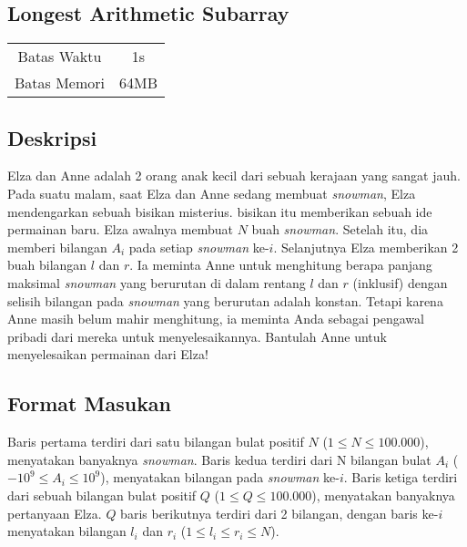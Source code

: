 \documentclass{article}
\begin{document}
\begin{center}
    \section*{Longest Arithmetic Subarray} %

    \begin{tabular}{ | c c | }
        \hline
        Batas Waktu  & 1s \\    %
        Batas Memori & 64MB \\  %
        \hline
    \end{tabular}
\end{center}

\subsection*{Deskripsi}

Elza dan Anne adalah 2 orang anak kecil dari sebuah kerajaan yang sangat jauh.
Pada suatu malam, saat Elza dan Anne sedang membuat \textit{snowman}, Elza mendengarkan sebuah bisikan misterius.
bisikan itu memberikan sebuah ide permainan baru. Elza awalnya membuat $N$ buah \textit{snowman}.
Setelah itu, dia memberi bilangan $A_i$ pada setiap \textit{snowman} ke-$i$.
Selanjutnya Elza memberikan 2 buah bilangan $l$ dan $r$. Ia meminta Anne untuk menghitung berapa panjang maksimal 
\textit{snowman} yang berurutan di dalam rentang $l$ dan $r$ (inklusif) dengan selisih bilangan pada \textit{snowman} yang 
berurutan adalah konstan. Tetapi karena Anne masih belum mahir menghitung, 
ia meminta Anda sebagai pengawal pribadi dari mereka untuk menyelesaikannya.
Bantulah Anne untuk menyelesaikan permainan dari Elza!

\subsection*{Format Masukan}

Baris pertama terdiri dari satu bilangan bulat positif $N$ ($1 \leq N \leq 100.000$), menyatakan banyaknya \textit{snowman}.
Baris kedua terdiri dari N bilangan bulat $A_i$ ($-10^{9} \leq A_i \leq 10^{9}$), menyatakan bilangan pada \textit{snowman} ke-$i$.
Baris ketiga terdiri dari sebuah bilangan bulat positif $Q$ ($1 \leq Q \leq 100.000$), menyatakan banyaknya pertanyaan Elza.
$Q$ baris berikutnya terdiri dari 2 bilangan, dengan baris ke-$i$ menyatakan bilangan $l_i$ dan $r_i$ ($1 \leq l_i \leq r_i \leq N$).
\end{document}
